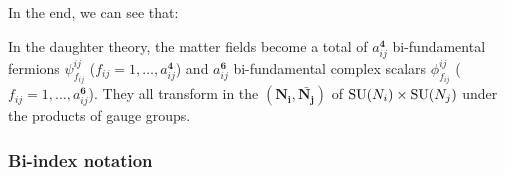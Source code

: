             In the end, we can see that:
            \begin{result}
                In the daughter theory, the matter fields become a total of $a^{\boldsymbol{4}}_{ij}$ bi-fundamental fermions $\psi^{ij}_{f_{ij}}$ ($f_{ij}=1,\dots,a^{\boldsymbol{4}}_{ij}$) and $a^{\boldsymbol{6}}_{ij}$ bi-fundamental complex scalars $\phi^{ij}_{f_{ij}}$ ($f_{ij}=1,\dots,a^{\boldsymbol{6}}_{ij}$). They all transform in the $(\boldsymbol{\textbf{N}_i},\bar{\boldsymbol{\textbf{N}_j}})$ of $\text{SU}(N_i)\times\text{SU}(N_j)$ under the products of gauge groups.
            \end{result}

        \subsubsection{Bi-index notation}

